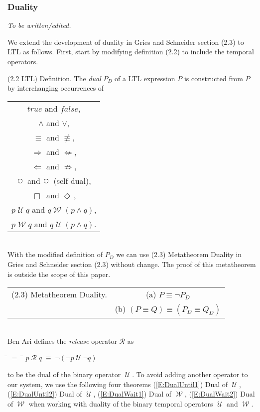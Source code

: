 \documentclass[12pt, fleqn, leqno]{article}
\newcommand{\lllgap}{12pt}                          %
\newcommand{\mymathindent}{24pt}                    %
\newcommand{\equivs}{\ensuremath{\;\equiv\;}}       %
\newcommand{\nequiv}{\ensuremath{\not\equiv}}       %
\newcommand{\impl}{\ensuremath{\Rightarrow}}        %
\newcommand{\nimpl}{\ensuremath{\not\Rightarrow}}   %
\newcommand{\foll}{\ensuremath{\Leftarrow}}         %
\newcommand{\nfoll}{\ensuremath{\not\Leftarrow}}    %
\newcommand{\Until}{\;\mathcal{U}\;}
\newcommand{\Wait}{\;\mathcal{W}\;}
\newcommand{\Next}{\;\,\text{\raisebox{3.5pt}{\circle{6}}}}
\newcommand{\Event}{\Diamond\,}
\newcommand{\Always}{\Box\,}
\newcommand{\myqedtab}{\hspace{384pt}}              %
\begin{document}
\subsubsection*{Duality}\label{section-duality}

\textit{To be written/edited.}

We extend the development of duality in Gries and Schneider \cite{LADM} section (2.3) to LTL as follows.
First, start by modifying definition (2.2) to include the temporal operators.

(2.2 LTL) Definition. The \textit{dual} $P_D$ of a LTL expression $P$ is constructed from $P$ by interchanging occurrences of\\[\lllgap]
\begin{tabular}{c}
$true$ and $false$,\\
$\land$ and $\lor$,\\
$\equiv$ and $\nequiv$,\\
$\impl$ and $\nfoll$,\\
$\foll$ and $\nimpl$,\\
$\Next$ and $\Next$ (self dual),\\
$\Always$ and $\Event$,\\
$p \Until q$ and $q \Wait (p \land q)$,\\
$p \Wait q$ and $q \Until (p \land q)$.
\end{tabular}\\[\lllgap]

With the modified definition of $P_D$ we can use (2.3) Metatheorem Duality in Gries and Schneider \cite{LADM} 
section (2.3) without change.
The proof of this metatheorem is outside the scope of this paper.\\[\lllgap]

 \begin{tabular}{cc}
(2.3) Metatheorem Duality.
&(a) $P \equiv \neg P_D$\\
&(b) $(P \equiv Q) \equiv (P_D \equiv Q_D)$
\end{tabular}\\[\lllgap]

Ben-Ari \cite{Ben} defines the \textit{release} operator $\mathcal{R}$ as
\begin{tabbing}
\hspace{\mymathindent} \= $= \;$ \= \myqedtab \= \kill
  \> $p\;\mathcal{R}\; q\equivs \neg(\neg p \Until \neg q)$
\end{tabbing}
to be the dual of the binary operator $\Until$.
To avoid adding another operator to our system, we use the following four theorems
(\ref{E:DualUntil1}) Dual of $\Until$,
(\ref{E:DualUntil2}) Dual of $\Until$,
(\ref{E:DualWait1}) Dual of $\Wait$,
(\ref{E:DualWait2}) Dual of $\Wait$
when working with duality of the binary temporal operators $\Until$ and $\Wait$.
\end{document}

